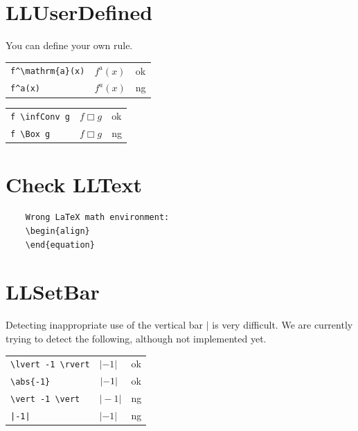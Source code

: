 \documentclass[a4paper]{article}
\newcommand{\tA}[1]{\textcolor{cA}{#1}}
\newcommand{\tD}[1]{\textcolor{cD}{#1}}
\DeclareMathOperator{\infConv}{\Box}
\begin{document}
\section{LLUserDefined}

You can define your own rule.

\begin{table}[H]
	\centering
	\begin{tabular}{lll}
		\verb|f^\mathrm{a}(x)| & $f^{\mathrm{a}}(x)$ & \tA{ok} \\
		\verb|f^a(x)|          & $f^a(x)$            & \tD{ng} \\
	\end{tabular}
\end{table}

\begin{table}[H]
	\centering
	\begin{tabular}{lll}
		\verb|f \infConv g| & $f \infConv g$ & \tA{ok} \\
		\verb|f \Box g|     & $f \Box g$     & \tD{ng} \\
	\end{tabular}
\end{table}




\newpage
\appendix

\renewcommand\thesection{Appendix \Alph{section}}

\section{Check LLText}

\begin{verbatim}
	Wrong LaTeX math environment:
	\begin{align}
	\end{equation}
\end{verbatim}

\section{LLSetBar}

Detecting inappropriate use of the vertical bar $|$ is very difficult.
We are currently trying to detect the following, although not implemented yet.

\begin{table}[H]
	\centering
	\begin{tabular}{lll}
		\verb#\lvert -1 \rvert# & $\lvert -1 \rvert$ & \tA{ok} \\
		\verb#\abs{-1}#         & $\abs{-1}$         & \tA{ok} \\
		\verb#\vert -1 \vert#   & $\vert -1 \vert$   & \tD{ng} \\
		\verb#|-1|#             & $|-1|$             & \tD{ng} \\
	\end{tabular}
\end{table}
\end{document}
